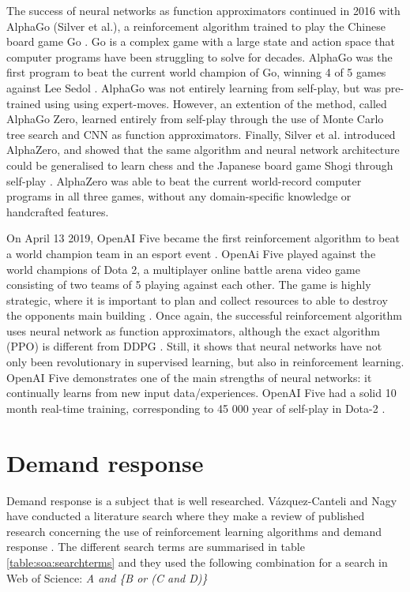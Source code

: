 \documentclass[class=book, crop=false, 11pt]{standalone}
\begin{document}
The success of neural networks as function approximators continued in 2016 with AlphaGo (Silver et al.), a reinforcement algorithm trained to play the Chinese board game Go \cite{alphago}. Go is a complex game with a large state and action space that computer programs have been struggling to solve for decades. AlphaGo was the first program to beat the current world champion of Go, winning 4 of 5 games against Lee Sedol \cite{Sutton1998}. AlphaGo was not entirely learning from self-play, but was pre-trained using using expert-moves. However, an extention of the method, called AlphaGo Zero, learned entirely from self-play through the use of Monte Carlo tree search and CNN as function approximators. Finally,  Silver et al. introduced AlphaZero, and showed that the same algorithm and neural network architecture could be generalised to learn chess and the Japanese board game Shogi through self-play \cite{alphazero}. AlphaZero was able to beat the current world-record computer programs in all three games, without any domain-specific knowledge or handcrafted features. 

On April 13 2019, OpenAI Five became the first reinforcement algorithm to beat a world champion team in an esport event \cite{openai_dota}. OpenAi Five played against the world champions of Dota 2, a multiplayer online battle arena video game consisting of two teams of 5 playing against each other. The game is highly strategic, where it is important to plan and collect resources to able to destroy the opponents main building \cite{dota_wiki}. Once again, the successful reinforcement algorithm uses neural network as function approximators, although the exact algorithm (PPO) is different from DDPG \cite{PPO_openAI_Schulman}. Still, it shows that neural networks have not only been revolutionary in supervised learning, but also in reinforcement learning. OpenAI Five demonstrates one of the main strengths of neural networks: it continually learns from new input data/experiences. OpenAI Five had a solid 10 month real-time training, corresponding to 45 000 year of self-play in Dota-2 \cite{openai_dota}.


\section{Demand response}
Demand response is a subject that is well researched. Vázquez-Canteli and Nagy have conducted a literature search where they make a review of published research concerning the use of reinforcement learning algorithms and demand response \cite{vazquez2019reinforcement}. The different search terms are summarised in table \ref{table:soa:searchterms} and they used the following combination for a search in  Web of Science: \textit{A and \{B or (C and D)\}}
\end{document}
